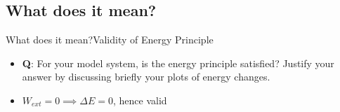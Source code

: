 





\subsection{What does it mean?}
\begin{frame}{What does it mean?}{Validity of Energy Principle}
\begin{itemize}
    \item \textbf{Q}: For your model system, is the energy principle satisfied? Justify your answer by discussing briefly your plots of energy changes.
    \item \(W_{ext} = 0 \implies \Delta E = 0\), hence valid
\end{itemize}
\end{frame}

